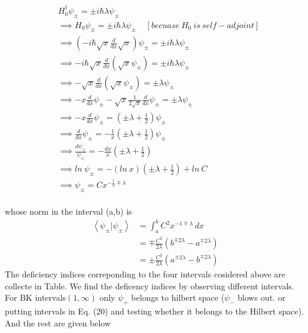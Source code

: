 \documentclass[12pt, letterpaper]{article}
\newcommand*{\1}{\hspace{1pt}}
\begin{document}
        \begin{align*}
            &H_{0}^{\dagger} \psi_{\pm} = \pm i \hbar \lambda \psi_{\pm} \\ 
            &\implies H_{0} \psi_{\pm} = \pm i \hbar \lambda \psi_{\pm} \ \ \ \ \ [becuase\ H_{0} \ is \ self-adjoint] \\
            &\implies \left(-i\hbar \sqrt{x} \frac{d}{dx}\sqrt{x}\right)\psi_{\pm} = \pm i \hbar \lambda \psi _{\pm} \\
            &\implies -i\hbar \sqrt{x} \frac{d}{dx}\left(\sqrt{x}\psi_{\pm}\right) = \pm i \hbar \lambda \psi _{\pm} \\
            &\implies -\sqrt{x} \frac{d}{dx}\left(\sqrt{x}\psi_{\pm}\right) = \pm \lambda \psi _{\pm} \\
            &\implies -x\frac{d}{dx}\psi_{\pm} - \sqrt{x}\frac{1}{2\sqrt{x}} \frac{d}{dx}\psi_{\pm} = \pm \lambda \psi _{\pm} \\
            &\implies -x\frac{d}{dx}\psi_{\pm} = \left(\pm \lambda + \frac{1}{2}\right) \psi _{\pm} \\
            &\implies \frac{d}{dx}\psi_{\pm} = -\frac{1}{x}\left(\pm \lambda + \frac{1}{2}\right) \psi _{\pm} \\
            &\implies \frac{d\psi_{\pm}}{\psi_{\pm}} = -\frac{dx}{x}\left(\pm \lambda + \frac{1}{2}\right) \\
            &\implies ln \ \psi_{\pm} = -\left(ln \ x\right)\left(\pm \lambda + \frac{1}{2}\right) + ln \ C\\
            &\implies \psi_{\pm} =  Cx^{- \frac{1}{2}\mp \lambda}\\
        \end{align*}

        whose norm in the interval (a,b) is
        \begin{equation}
            \begin{split}
            \left\langle \psi_{\pm} | \psi_{\pm} \right\rangle &= \int_{a}^{b} C^{2} x^{-1\mp \lambda} \,dx \\
            &= \mp \frac{C^{2}}{2\lambda}\left(b^{\mp 2\lambda} - a^{\mp 2\lambda}\right) \\  
            &= \pm \frac{C^{2}}{2\lambda}\left(a^{\mp 2\lambda} - b^{\mp 2\lambda}\right) 
            \end{split}
        \end{equation}
        The deficiency indices correponding to the four intervals cosidered above are collecte in Table. We find the deficency indices by observing different intervals.
        For BK intervals$(1,\infty)$ only $\psi_{+}$ belongs to hilbert space ($\psi_{-}$ blows out. or putting intervals in Eq. (20) and testing whether it belongs to
        the Hilbert space). And the rest are given below
        
\end{document}
